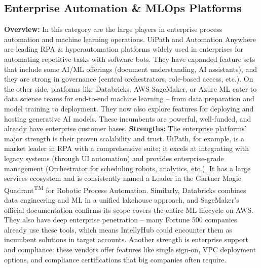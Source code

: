 \subsection{Enterprise Automation \& MLOps Platforms}
\textbf{Overview:} In this category are the large players in enterprise process automation and machine learning operations. UiPath and Automation Anywhere are leading RPA \& hyperautomation platforms widely used in enterprises for automating repetitive tasks with software bots. They have expanded feature sets that include some AI/ML offerings (document understanding, AI assistants), and they are strong in governance (central orchestrators, role-based access, etc.). On the other side, platforms like Databricks, AWS SageMaker, or Azure ML cater to data science teams for end-to-end machine learning – from data preparation and model training to deployment. They now also explore features for deploying and hosting generative AI models. These incumbents are powerful, well-funded, and already have enterprise customer bases.
\newline\newline
\textbf{Strengths:} The enterprise platforms' major strength is their proven scalability and trust. UiPath, for example, is a market leader in RPA with a comprehensive suite; it excels at integrating with legacy systems (through UI automation) and provides enterprise-grade management (Orchestrator for scheduling robots, analytics, etc.). It has a large services ecosystem and is consistently named a Leader in the Gartner\textsuperscript{\textregistered} Magic Quadrant\textsuperscript{TM} for Robotic Process Automation\cite{uipathGartner}. Similarly, Databricks combines data engineering and ML in a unified lakehouse approach, and SageMaker's official documentation confirms its scope covers the entire ML lifecycle on AWS\cite{awsSagemaker}. They also have deep enterprise penetration – many Fortune 500 companies already use these tools, which means IntellyHub could encounter them as incumbent solutions in target accounts. Another strength is enterprise support and compliance: these vendors offer features like single sign-on, VPC deployment options, and compliance certifications that big companies often require.
\newline\newline
